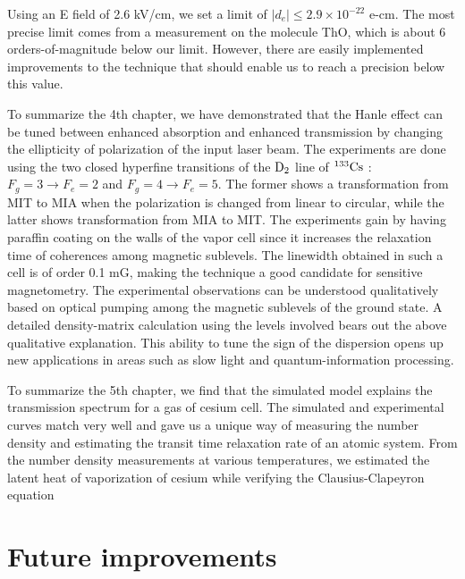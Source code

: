 Using an E field of 2.6 kV/cm, we set a limit of $\lvert d_e \lvert \leq 2.9 \times 10^{-22}$ e-cm. The most precise limit comes from a measurement on the molecule ThO, which is about 6 orders-of-magnitude below our limit. However, there are easily implemented improvements to the technique that should enable us to reach a precision below this value.

To summarize the 4th chapter, we have demonstrated that the Hanle effect can be tuned between enhanced absorption and enhanced transmission by changing the ellipticity of polarization of the input laser beam. The experiments are done using the two closed hyperfine transitions of the $\rm D_2 $ line of ${^{133}\rm Cs} $ : $F_g = 3 \rightarrow F_e = 2 $ and $ F_g = 4 \rightarrow F_e = 5 $. The former shows a transformation from MIT to MIA when the polarization is changed from linear to circular, while the latter shows transformation from MIA to MIT. The experiments gain by having paraffin coating on the walls of the vapor cell since it increases the relaxation time of coherences among magnetic sublevels. The linewidth obtained in such a cell is of order 0.1 mG, making the technique a good candidate for sensitive magnetometry. The experimental observations can be understood qualitatively based on optical pumping among the magnetic sublevels of the ground state. A detailed density-matrix calculation using the levels involved bears out the above qualitative explanation. This ability to tune the sign of the dispersion opens up new applications in areas such as slow light and quantum-information processing.

To summarize the 5th chapter, we find that the simulated model explains the transmission spectrum for a gas of cesium cell. The simulated and experimental curves match very well and gave us a unique way of measuring the number density and estimating the transit time relaxation rate of an atomic system. From the number density measurements at various temperatures, we estimated the latent heat of vaporization of cesium while verifying the Clausius-Clapeyron equation

\section{Future improvements}

